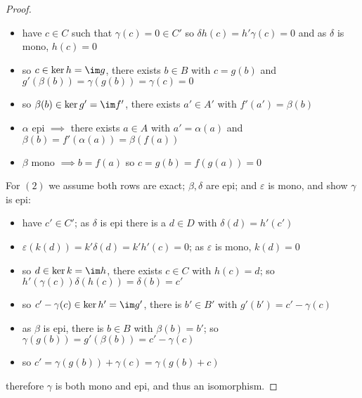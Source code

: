 \documentclass[a4paper]{article}
\begin{document}
\begin{theorem}
\begin{proof}
\begin{itemize}
        \item have $c\in C$ such that $\gamma(c)=0\in C'$ so $\delta h(c) = h'\gamma(c) = 0$ and as $\delta$ is mono, $h(c)=0$
        \item so $c\in \ker h = \im g$, there exists $b\in B$ with $c=g(b)$ and $g'(\beta(b)) = \gamma(g(b)) = \gamma(c) = 0$
        \item so $\beta(b)\in\ker g'=\im f'$, there exists $a'\in A'$ with $f'(a') = \beta(b)$
        \item $\alpha$ epi $\implies$ there exists $a\in A$ with $a' = \alpha(a)$ and $\beta(b) = f'(\alpha(a)) = \beta(f(a))$
        \item $\beta$ mono $\implies b=f(a)$ so $c=g(b) = f(g(a)) = 0$
    \end{itemize} 
    For $(2)$ we assume both rows are exact; $\beta,\delta$ are epi; and $\varepsilon$ is mono, and show $\gamma$ is epi:
    \begin{itemize}
        \item have $c'\in C'$; as $\delta$ is epi there is a $d\in D$ with $\delta(d)=h'(c')$
        \item $\varepsilon (k(d)) = k'\delta(d) = k'h'(c) = 0$; as $\varepsilon$ is mono, $k(d) = 0$
        \item so $d\in\ker k = \im h$, there exists $c\in C$ with  $h(c) = d$; so $h'(\gamma(c))\delta(h(c)) = \delta(b) = c'$
        \item so $c'-\gamma(c)\in\ker h' = \im g'$, there is $b'\in B'$ with $g'(b')=c'-\gamma(c)$
        \item as $\beta$ is epi, there is $b\in B$ with $\beta(b) = b'$; so $\gamma(g(b)) = g'(\beta(b)) = c'-\gamma(c)$
        \item so $c'=\gamma(g(b))+\gamma(c) = \gamma(g(b) + c)$
    \end{itemize} 
    therefore $\gamma$ is both mono and epi, and thus an isomorphism.
    \end{proof}
\end{theorem}


\end{document}
